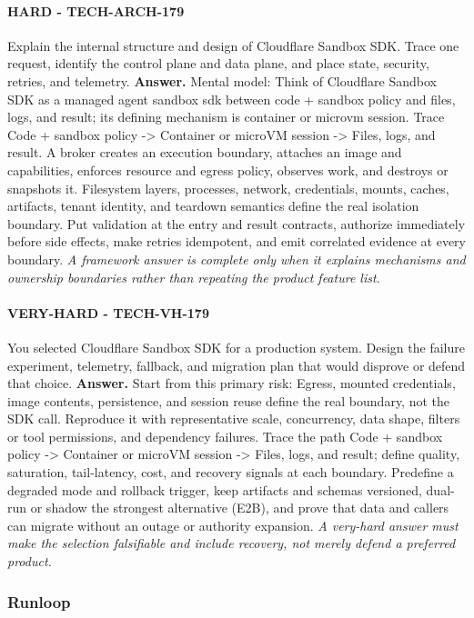 \paragraph{HARD - TECH-ARCH-179} Explain the internal structure and design of Cloudflare Sandbox SDK. Trace one request, identify the control plane and data plane, and place state, security, retries, and telemetry.
\textbf{Answer.} Mental model: Think of Cloudflare Sandbox SDK as a managed agent sandbox sdk between code + sandbox policy and files, logs, and result; its defining mechanism is container or microvm session. Trace Code + sandbox policy -> Container or microVM session -> Files, logs, and result. A broker creates an execution boundary, attaches an image and capabilities, enforces resource and egress policy, observes work, and destroys or snapshots it. Filesystem layers, processes, network, credentials, mounts, caches, artifacts, tenant identity, and teardown semantics define the real isolation boundary. Put validation at the entry and result contracts, authorize immediately before side effects, make retries idempotent, and emit correlated evidence at every boundary.
\textit{A framework answer is complete only when it explains mechanisms and ownership boundaries rather than repeating the product feature list.}
\paragraph{VERY-HARD - TECH-VH-179} You selected Cloudflare Sandbox SDK for a production system. Design the failure experiment, telemetry, fallback, and migration plan that would disprove or defend that choice.
\textbf{Answer.} Start from this primary risk: Egress, mounted credentials, image contents, persistence, and session reuse define the real boundary, not the SDK call. Reproduce it with representative scale, concurrency, data shape, filters or tool permissions, and dependency failures. Trace the path Code + sandbox policy -> Container or microVM session -> Files, logs, and result; define quality, saturation, tail-latency, cost, and recovery signals at each boundary. Predefine a degraded mode and rollback trigger, keep artifacts and schemas versioned, dual-run or shadow the strongest alternative (E2B), and prove that data and callers can migrate without an outage or authority expansion.
\textit{A very-hard answer must make the selection falsifiable and include recovery, not merely defend a preferred product.}
\subsubsection*{Runloop}
